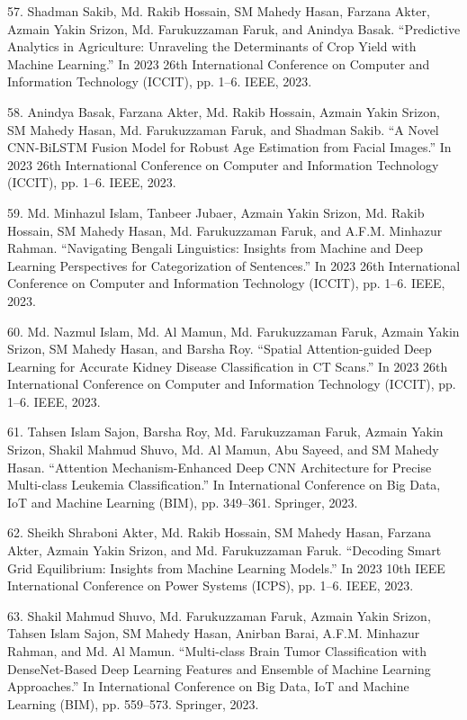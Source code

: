 \documentclass[a4paper,10pt]{article}
\newlength{\cvcolumngapwidth}
\newlength{\cvleftcolumnwidth}
\newlength{\cvrightcolumnwidth}
\newcommand{\cvdurationstyle}[1]{{\small\cvdurationfont\textcolor{cvdurationcolor}{#1}}}
\newlength{\cvafteritemskipamount}
\newlength{\cvparskip}
\newcommand{\cvitem}[2]{
    \begin{minipage}[t]{\cvleftcolumnwidth}
        \raggedleft #1
    \end{minipage}%
    \hspace{\cvcolumngapwidth}%
    \begin{minipage}[t]{\cvrightcolumnwidth}
        \setlength{\parskip}{\cvparskip} #2
    \end{minipage}

    \vspace{\cvafteritemskipamount}
}
\begin{document}
\cvitem{
    \cvdurationstyle{}
}{
57. Shadman Sakib, Md. Rakib Hossain, SM Mahedy Hasan, Farzana Akter, Azmain Yakin Srizon, Md. Farukuzzaman Faruk, and Anindya Basak. “Predictive Analytics in Agriculture: Unraveling the Determinants of Crop Yield with Machine Learning.” In 2023 26th International Conference on Computer and Information Technology (ICCIT), pp. 1–6. IEEE, 2023.
}

\cvitem{
    \cvdurationstyle{}
}{
58. Anindya Basak, Farzana Akter, Md. Rakib Hossain, Azmain Yakin Srizon, SM Mahedy Hasan, Md. Farukuzzaman Faruk, and Shadman Sakib. “A Novel CNN-BiLSTM Fusion Model for Robust Age Estimation from Facial Images.” In 2023 26th International Conference on Computer and Information Technology (ICCIT), pp. 1–6. IEEE, 2023.
}

\cvitem{
    \cvdurationstyle{}
}{
59. Md. Minhazul Islam, Tanbeer Jubaer, Azmain Yakin Srizon, Md. Rakib Hossain, SM Mahedy Hasan, Md. Farukuzzaman Faruk, and A.F.M. Minhazur Rahman. “Navigating Bengali Linguistics: Insights from Machine and Deep Learning Perspectives for Categorization of Sentences.” In 2023 26th International Conference on Computer and Information Technology (ICCIT), pp. 1–6. IEEE, 2023.
}

\cvitem{
    \cvdurationstyle{}
}{
60. Md. Nazmul Islam, Md. Al Mamun, Md. Farukuzzaman Faruk, Azmain Yakin Srizon, SM Mahedy Hasan, and Barsha Roy. “Spatial Attention-guided Deep Learning for Accurate Kidney Disease Classification in CT Scans.” In 2023 26th International Conference on Computer and Information Technology (ICCIT), pp. 1–6. IEEE, 2023.
}

\cvitem{
    \cvdurationstyle{}
}{
61. Tahsen Islam Sajon, Barsha Roy, Md. Farukuzzaman Faruk, Azmain Yakin Srizon, Shakil Mahmud Shuvo, Md. Al Mamun, Abu Sayeed, and SM Mahedy Hasan. “Attention Mechanism-Enhanced Deep CNN Architecture for Precise Multi-class Leukemia Classification.” In International Conference on Big Data, IoT and Machine Learning (BIM), pp. 349–361. Springer, 2023.
}

\cvitem{
    \cvdurationstyle{}
}{
62. Sheikh Shraboni Akter, Md. Rakib Hossain, SM Mahedy Hasan, Farzana Akter, Azmain Yakin Srizon, and Md. Farukuzzaman Faruk. “Decoding Smart Grid Equilibrium: Insights from Machine Learning Models.” In 2023 10th IEEE International Conference on Power Systems (ICPS), pp. 1–6. IEEE, 2023.
}

\cvitem{
    \cvdurationstyle{}
}{
63. Shakil Mahmud Shuvo, Md. Farukuzzaman Faruk, Azmain Yakin Srizon, Tahsen Islam Sajon, SM Mahedy Hasan, Anirban Barai, A.F.M. Minhazur Rahman, and Md. Al Mamun. “Multi-class Brain Tumor Classification with DenseNet-Based Deep Learning Features and Ensemble of Machine Learning Approaches.” In International Conference on Big Data, IoT and Machine Learning (BIM), pp. 559–573. Springer, 2023.
}
\end{document}
